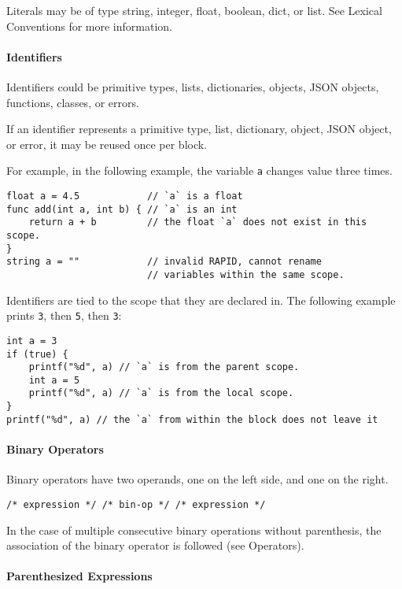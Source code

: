 Literals may be of type string, integer, float, boolean, dict, or list.
See Lexical Conventions for more information.

\paragraph{Identifiers}\label{identifiers-1}

Identifiers could be primitive types, lists, dictionaries, objects, JSON
objects, functions, classes, or errors.

If an identifier represents a primitive type, list, dictionary, object,
JSON object, or error, it may be reused once per block.

For example, in the following example, the variable \texttt{a} changes
value three times.

\begin{verbatim}
float a = 4.5            // `a` is a float
func add(int a, int b) { // `a` is an int
    return a + b         // the float `a` does not exist in this scope.
}
string a = ""            // invalid RAPID, cannot rename
                         // variables within the same scope.
\end{verbatim}

Identifiers are tied to the scope that they are declared in. The
following example prints \texttt{3}, then \texttt{5}, then \texttt{3}:

\begin{verbatim}
int a = 3
if (true) {
    printf("%d", a) // `a` is from the parent scope.
    int a = 5
    printf("%d", a) // `a` is from the local scope.
}
printf("%d", a) // the `a` from within the block does not leave it
\end{verbatim}

\paragraph{Binary Operators}\label{binary-operators}

Binary operators have two operands, one on the left side, and one on the
right.

\begin{verbatim}
/* expression */ /* bin-op */ /* expression */
\end{verbatim}

In the case of multiple consecutive binary operations without
parenthesis, the association of the binary operator is followed (see
Operators).

\paragraph{Parenthesized Expressions}\label{parenthesized-expressions}

